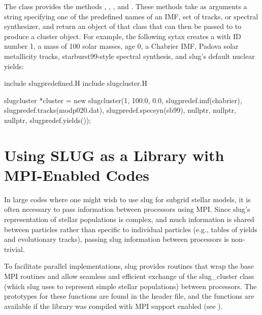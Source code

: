 \documentclass[letterpaper,10pt,english]{sphinxmanual}
\begin{document}
The  class provides the methods , ,
, and . These methods take as arguments a string
specifying one of the predefined names of an IMF, set of tracks, or
spectral synthesizer, and return an object of that class that can then
be passed to  to produce a cluster object. For
example, the following sytax creates a  with ID number
1, a mass of 100 solar masses, age 0, a Chabrier IMF, Padova solar
metallicity tracks, starburst99-style spectral synthesis, and slug’s
default nuclear yields:

\begin{sphinxVerbatim}[commandchars=\\\{\}]
\PYGZsh{}include \PYGZdq{}slug\PYGZus{}predefined.H\PYGZdq{}
\PYGZsh{}include \PYGZdq{}slug\PYGZus{}cluster.H\PYGZdq{}

slug\PYGZus{}cluster *cluster =
   new slug\PYGZus{}cluster(1, 100.0, 0.0, slug\PYGZus{}predef.imf(\PYGZdq{}chabrier\PYGZdq{}),
                    slug\PYGZus{}predef.tracks(\PYGZdq{}modp020.dat\PYGZdq{}),
                    slug\PYGZus{}predef.specsyn(\PYGZdq{}sb99\PYGZdq{}),
                    nullptr, nullptr, nullptr,
                    slug\PYGZus{}predef.yields());
\end{sphinxVerbatim}


\section{Using SLUG as a Library with MPI-Enabled Codes}
\label{\detokenize{library:using-slug-as-a-library-with-mpi-enabled-codes}}\label{\detokenize{library:ssec-mpi-support}}
In large codes where one might wish to use slug for subgrid stellar
models, it is often necessary to pass information between processors
using MPI. Since slug’s representation of stellar populations is
complex, and much information is shared between particles rather than
specific to individual particles (e.g., tables of yields and
evolutionary tracks), passing slug information between processors is
non-trivial.

To facilitate parallel implementations, slug provides routines that
wrap the base MPI routines and allow seamless and efficient exchange
of the slug\_cluster class (which slug uses to represent simple stellar
populations) between processors. The prototypes for these functions
are found in the  header file, and the functions are
available if the library was compiled with MPI support enabled (see
{\hyperref[\detokenize{library:ssec-library-mode}]{}}).
\end{document}
